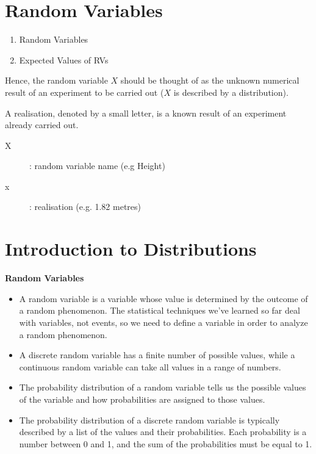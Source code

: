 \documentclass[]{report}
\begin{document}
{%





\section{Random Variables}
\begin{enumerate}
\item Random Variables
\item Expected Values of RVs
\end{enumerate}

Hence, the random variable $X$ should be thought of as the
unknown numerical result of an experiment to be carried out ($X$ is
described by a distribution).

A realisation, denoted by a small letter, is a known result of an
experiment already carried out.


\begin{description}
\item[X] : random variable name (e.g Height)
\item[x] : realisation (e.g. 1.82 metres) 
\end{description}


\section{Introduction to Distributions}

\noindent \textbf{Random Variables}
\begin{itemize}
\item A random variable is a variable whose value is determined by the outcome of a random phenomenon.
The statistical techniques we've learned so far deal with variables, not events, so we need to define a
variable in order to analyze a random phenomenon.
\item A discrete random variable has a finite number of possible values, while a continuous random variable
can take all values in a range of numbers.
\end{itemize}



\begin{itemize}
\item The probability distribution of a random variable tells us the possible values of the variable and how
probabilities are assigned to those values.
\item The probability distribution of a discrete random variable is typically described by a list of the
values and their probabilities. Each probability is a number between 0 and 1, and the sum of the
probabilities must be equal to 1.


\end{itemize}}
\end{document}
